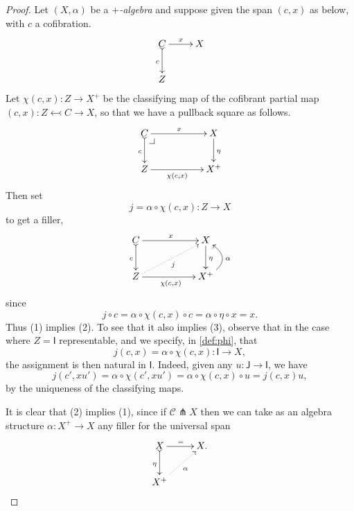 \documentclass[11pt,reqno]{amsart}
\makeatletter
\newcommand{\rep}[1]{\ensuremath{\mathsf{#1}}}%
\newcommand{\ra}{\ensuremath{\rightarrow}}
\renewcommand{\to}{\ensuremath{\rightarrow}}
\theoremstyle{remark}
\theoremstyle{definition}
\newcommand{\pbcorner}[1][dr]{\save*!/#1-1.2pc/#1:(-1,1)@^{|-}\restore}
\makeatother
\begin{document}
\begin{proof}
Let $(X, \alpha)$ be a \emph{$+$-algebra} and suppose given the span $(c,x)$ as below, with $c$ a cofibration. 
\begin{equation*}%
\xymatrix{
C \ar@{>->}[d]_{c} \ar[r]^{x} & X \\
Z &
}
\end{equation*}
Let $\chi(c,x): Z\ra X^+$ be the classifying map of the cofibrant partial map $(c,x) : Z \leftarrowtail C \to X$, so that we have a pullback square as follows.
\begin{equation}\label{diagram:defphi}
\xymatrix{
C \ar@{>->}[d]_{c} \ar[rr]^{x} \pbcorner && X \ar[d]^{\eta} \\
Z \ar[rr]_-{\chi(c,x)} && X^+
}
\end{equation}
Then set
\begin{equation}\label{def:phi}
j = \alpha\circ\chi(c,x) : Z\ra X
\end{equation}
to get a filler,
\begin{equation}\label{diagram:defphi2}
\xymatrix{
C \ar@{>->}[d]_{c} \ar[rr]^{x} && X \ar[d]^{\eta} \\
Z\ar@{.>}[rru]_{j} \ar[rr]_{\chi(c,x)} && X^+  \ar@/_4ex/ [u]_\alpha
}
\end{equation}
since 
\[
j\circ c = \alpha\circ\chi(c,x)\circ c = \alpha\circ\eta \circ x = x.
\]
Thus (1) implies (2).  To see that it also implies (3), observe that in the case where $Z=\rep{I}$ representable, and we specify, in \eqref{def:phi}, that
\begin{equation}\label{def:j}
j(c,x) = \alpha\circ\chi(c,x) : \rep{I}\ra X,
\end{equation}
the assignment is then natural in $\rep{I}$. Indeed,  given any $u : \rep{J} \ra \rep{I}$, we have
\begin{equation}\label{eq:proof,uniformfillers}
j(c',xu') = \alpha\circ\chi(c',xu') = \alpha\circ\chi(c,x)\circ u = j(c,x) u,
\end{equation}
by the uniqueness of the classifying maps.

It is clear that (2) implies (1), since if $\mathcal{C} \pitchfork X$ then we can take as an algebra structure $\alpha : X^+ \ra X$ any filler for the universal span
\[
\xymatrix{
X \ar@{>->}[d]_{\eta} \ar[r]^{=} & X .\\
X^+ \ar@{.>}[ru]_\alpha&
}
\]


\end{proof}
\end{document}
